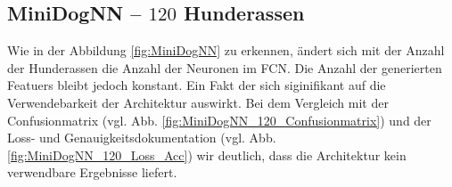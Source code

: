 %
\subsection{MiniDogNN -- $120$ Hunderassen}
Wie in der Abbildung \ref{fig:MiniDogNN} zu erkennen, ändert sich mit der
Anzahl der Hunderassen die Anzahl der Neuronen im FCN. Die Anzahl der generierten
Featuers bleibt jedoch konstant. Ein Fakt der sich siginifikant auf die
Verwendebarkeit der Architektur auswirkt. Bei dem Vergleich mit der Confusionmatrix
(vgl. Abb. \ref{fig:MiniDogNN_120_Confusionmatrix}) und
der Loss- und Genauigkeitsdokumentation (vgl. Abb. \ref{fig:MiniDogNN_120_Loss_Acc})
wir deutlich, dass die Architektur kein verwendbare Ergebnisse liefert.

